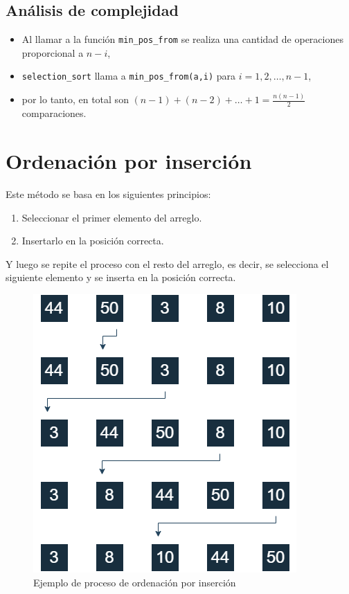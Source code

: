 \subsection{Análisis de complejidad}
\begin{itemize}
    \item Al llamar a la función \texttt{min\_pos\_from} se realiza una cantidad de operaciones proporcional a $n-i$,
    \item \texttt{selection\_sort} llama a \texttt{min\_pos\_from(a,i)} para $i=1,2,\ldots,n-1$,
    \item por lo tanto, en total son $(n-1) + (n-2) + \ldots + 1 = \frac{n(n-1)}{2}$ comparaciones.
\end{itemize}

\section{Ordenación por inserción}
Este método se basa en los siguientes principios:
\begin{enumerate}
    \item Seleccionar el primer elemento del arreglo.
    \item Insertarlo en la posición correcta.
\end{enumerate}
Y luego se repite el proceso con el resto del arreglo, es decir, se selecciona el siguiente elemento y se inserta en la posición correcta.

\newpage
\begin{figure}[h]
\centering
\includegraphics[scale=0.5]{./estáticos/ordInsercion.png}
\caption{Ejemplo de proceso de ordenación por inserción}
\end{figure}

